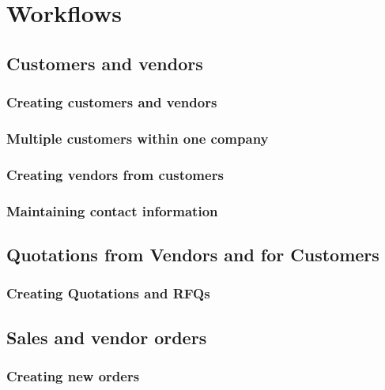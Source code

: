 

\part{Workflows}
\label{part:Workflows}

\chapter{Customers and vendors}

\section{Creating customers and vendors}

\section{Multiple customers within one company}

\section{Creating vendors from customers}


\section{Maintaining contact information}


\chapter{Quotations from Vendors and for Customers}

\section{Creating Quotations and RFQs}

\chapter{Sales and vendor orders}
\label{cha:OrderManagement}

\section{Creating new orders}

